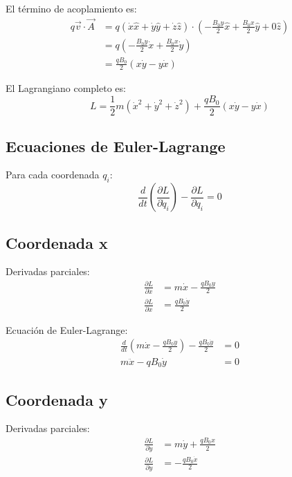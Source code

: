 \documentclass{article}
\begin{document}
El término de acoplamiento es:
\begin{align}
q\vec{v} \cdot \vec{A} &= q(\dot{x}\hat{x} + \dot{y}\hat{y} + \dot{z}\hat{z}) \cdot \left(-\frac{B_0 y}{2}\hat{x} + \frac{B_0 x}{2}\hat{y} + 0\hat{z}\right) \\
&= q\left(-\frac{B_0 y}{2}\dot{x} + \frac{B_0 x}{2}\dot{y}\right) \\
&= \frac{qB_0}{2}(x\dot{y} - y\dot{x})
\end{align}

El Lagrangiano completo es:
\begin{equation}
L = \frac{1}{2}m(\dot{x}^2 + \dot{y}^2 + \dot{z}^2) + \frac{qB_0}{2}(x\dot{y} - y\dot{x})
\end{equation}

\subsection*{Ecuaciones de Euler-Lagrange}

Para cada coordenada $q_i$:
\begin{equation}
\frac{d}{dt}\left(\frac{\partial L}{\partial \dot{q}_i}\right) - \frac{\partial L}{\partial q_i} = 0
\end{equation}

\subsection*{Coordenada x}

Derivadas parciales:
\begin{align}
\frac{\partial L}{\partial \dot{x}} &= m\dot{x} - \frac{qB_0 y}{2} \\
\frac{\partial L}{\partial x} &= \frac{qB_0 \dot{y}}{2}
\end{align}

Ecuación de Euler-Lagrange:
\begin{align}
\frac{d}{dt}\left(m\dot{x} - \frac{qB_0 y}{2}\right) - \frac{qB_0 \dot{y}}{2} &= 0 \\
m\ddot{x} - qB_0 \dot{y} &= 0
\end{align}

\subsection*{Coordenada y}

Derivadas parciales:
\begin{align}
\frac{\partial L}{\partial \dot{y}} &= m\dot{y} + \frac{qB_0 x}{2} \\
\frac{\partial L}{\partial y} &= -\frac{qB_0 \dot{x}}{2}
\end{align}
\end{document}
